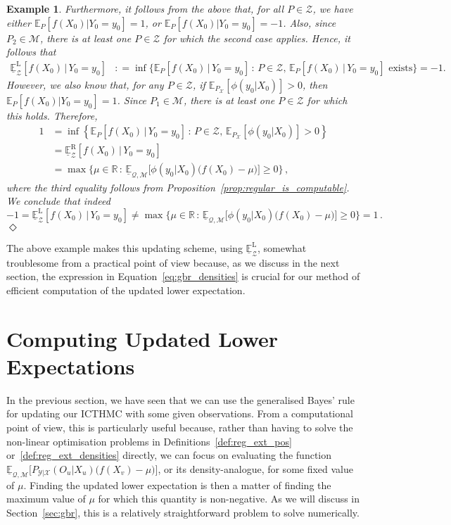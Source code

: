 \documentclass[3p]{elsarticle}
\newtheorem{example}{Example}[section]
\newcommand{\reals}{\mathbb{R}}
\newcommand{\states}{\mathcal{X}}
\newcommand{\observs}{\mathcal{Y}}
\newcommand{\lexp}{\underline{\mathbb{E}}_{\rateset,\mathcal{M}}}
\newcommand{\rateset}{\mathcal{Q}}
\newcommand{\coloneqq}{:\!=}
\newcommand{\exampleend}{\hfill$\Diamond$}
\begin{document}
\begin{example}
Furthermore, it follows from the above that, for all $P\in\mathcal{Z}$, we have either $\mathbb{E}_P[f(X_0)\vert Y_0=y_0]=1$, or $\mathbb{E}_P[f(X_0)\vert Y_0=y_0]=-1$. Also, since $P_2\in\mathcal{M}$, there is at least one $P\in\mathcal{Z}$ for which the second case applies. Hence, it follows that
\begin{align*}
\underline{\mathbb{E}}_\mathcal{Z}^\mathrm{L}[f(X_0)\,\vert\, Y_0=y_0] &\coloneqq \inf\bigl\{\mathbb{E}_P[f(X_0)\,\vert\,Y_0=y_0]\,:\,P\in\mathcal{Z},\,\text{$\mathbb{E}_P[f(X_0)\,\vert\,Y_0=y_0]$ exists}\bigr\}= -1.
\end{align*}
However, we also know that, for any $P\in\mathcal{Z}$, if $\mathbb{E}_{P_\states}[\phi(y_0\vert X_0)]>0$, then $\mathbb{E}_{P}[f(X_0)\vert Y_0=y_0]=1$. Since $P_1\in\mathcal{M}$, there is at least one $P\in\mathcal{Z}$ for which this holds. Therefore,
\begin{align*}
1 &= \inf\left\{\mathbb{E}_P[f(X_0)\,\vert\,Y_0=y_0]\,:\,P\in\mathcal{Z},\,\mathbb{E}_{P_\states}[\phi(y_0\vert X_0)]>0\right\} \\
 &= \underline{\mathbb{E}}_\mathcal{Z}^\mathrm{R}[f(X_0)\,\vert\,Y_0=y_0] \\
 &= \max\{\mu\in\reals\,:\,\lexp\bigl[\phi(y_0\vert X_0)\bigl(f(X_0)-\mu\bigr)\bigr]\geq 0\}\,,
\end{align*}
where the third equality follows from Proposition~\ref{prop:regular_is_computable}. We conclude that indeed
\begin{equation*}
-1 = \underline{\mathbb{E}}_\mathcal{Z}^\mathrm{L}[f(X_0)\,\vert\, Y_0=y_0] \neq 
\max\{\mu\in\reals\,:\,\lexp\bigl[\phi(y_0\vert X_0)\bigl(f(X_0)-\mu\bigr)\bigr]\geq 0\} = 1\,.
\end{equation*}
\exampleend
\end{example}

The above example makes this updating scheme, using $\underline{\mathbb{E}}_\mathcal{Z}^\mathrm{L}$, somewhat troublesome from a practical point of view because, as we discuss in the next section, the expression in Equation~\eqref{eq:gbr_densities} is crucial for our method of efficient computation of the updated lower expectation.


\section{Computing Updated Lower Expectations}\label{sec:inference_algos}

In the previous section, we have seen that we can use the generalised Bayes' rule for updating our ICTHMC with some given observations. From a computational point of view, this is particularly useful because, rather than having to solve the non-linear optimisation problems 
in Definitions~\ref{def:reg_ext_pos} or~\ref{def:reg_ext_densities} directly, 
we can focus on evaluating the function $\lexp\bigl[P_{\observs\vert\states}(O_u\vert X_u)\bigl(f(X_v) - \mu\bigr)\bigr]$,
or its density-analogue, for some fixed value of $\mu$. Finding the updated lower expectation is then a matter of finding the maximum value of $\mu$ for which this quantity is non-negative. As we will discuss in Section~\ref{sec:gbr}, this is a relatively straightforward problem to solve numerically.
\end{document}
